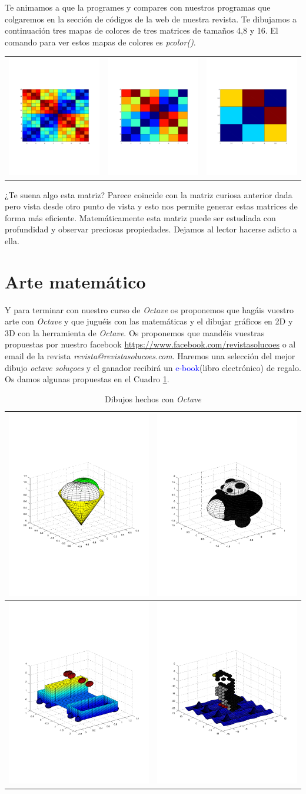 Te animamos a que la programes y compares con nuestros programas que colgaremos en la sección de códigos de la web de nuestra revista. Te dibujamos a continuación tres mapas de colores de tres matrices de tamaños 4,8 y 16. El comando para ver estos mapas de colores es \emph{pcolor()}. 
\begin{center}
\begin{tabular}{ccc}
\includegraphics[scale=0.28]{a16.pdf} &\includegraphics[scale=0.28]{a8.pdf} & \includegraphics[scale=0.28]{a4.pdf}\\
\end{tabular}
\end{center}

¿Te suena algo esta matriz? Parece coincide con la matriz curiosa anterior dada  pero vista desde otro punto de vista y esto nos permite generar estas matrices de forma más eficiente. Matemáticamente esta matriz puede ser estudiada con profundidad y observar preciosas propiedades. Dejamos al lector hacerse adicto a ella.

\section{Arte matemático}
Y para terminar con nuestro curso de \emph{Octave} os proponemos que hagáis vuestro arte con \emph{Octave} y que juguéis con las matemáticas y el dibujar gráficos en 2D y 3D con la herramienta de \emph{Octave}. Os proponemos que mandéis vuestras propuestas por nuestro facebook \url{https://www.facebook.com/revistasolucoes} o al email de la revista \emph{revista@revistasolucoes.com}. Haremos una selección del mejor dibujo \emph{octave soluçoes} y el ganador recibirá un \textcolor{blue}{e-book}(libro electrónico) de regalo. Os damos algunas propuestas en el Cuadro \ref{propos}.

\begin{table}
\begin{center}
\begin{tabular}{c|c}
\includegraphics[scale=0.34]{helado.pdf} & \includegraphics[scale=0.34]{panda.pdf}\\\hline
\includegraphics[scale=0.34]{tren.pdf} &  \includegraphics[scale=0.34]{pinguino.pdf}\\
\end{tabular}\caption{Dibujos hechos con \emph{Octave}}\label{propos}

\end{center}
\end{table}
